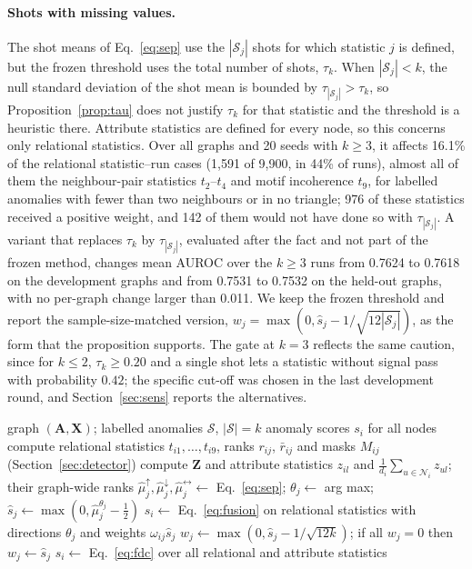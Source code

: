 \documentclass[pdflatex,sn-mathphys-ay]{sn-jnl}
\theoremstyle{plain}
\theoremstyle{remark}
\begin{document}
\paragraph{Shots with missing values.} The shot means of Eq.~\eqref{eq:sep} use the $|\mathcal{S}_j|$ shots for which statistic $j$ is defined, but the frozen threshold uses the total number of shots, $\tau_k$. When $|\mathcal{S}_j|<k$, the null standard deviation of the shot mean is bounded by $\tau_{|\mathcal{S}_j|}>\tau_k$, so Proposition~\ref{prop:tau} does not justify $\tau_k$ for that statistic and the threshold is a heuristic there. Attribute statistics are defined for every node, so this concerns only relational statistics. Over all graphs and 20 seeds with $k\ge3$, it affects 16.1\% of the relational statistic--run cases (1{,}591 of 9{,}900, in 44\% of runs), almost all of them the neighbour-pair statistics $t_2$--$t_4$ and motif incoherence $t_9$, for labelled anomalies with fewer than two neighbours or in no triangle; 976 of these statistics received a positive weight, and 142 of them would not have done so with $\tau_{|\mathcal{S}_j|}$. A variant that replaces $\tau_k$ by $\tau_{|\mathcal{S}_j|}$, evaluated after the fact and not part of the frozen method, changes mean AUROC over the $k\ge3$ runs from 0.7624 to 0.7618 on the development graphs and from 0.7531 to 0.7532 on the held-out graphs, with no per-graph change larger than 0.011. We keep the frozen threshold and report the sample-size-matched version, $w_j=\max(0,\hat s_j-1/\sqrt{12|\mathcal{S}_j|})$, as the form that the proposition supports. The gate at $k=3$ reflects the same caution, since for $k\le2$, $\tau_k\ge0.20$ and a single shot lets a statistic without signal pass with probability $0.42$; the specific cut-off was chosen in the last development round, and Section~\ref{sec:sens} reports the alternatives.

\begin{algorithm}[!ht]
\caption{Few-shot direction calibration (FDC)}\label{alg:fdc}
\begin{algorithmic}[1]
\Require graph $(\mathbf{A},\mathbf{X})$; labelled anomalies $\mathcal{S}$, $|\mathcal{S}|=k$
\Ensure anomaly scores $s_i$ for all nodes
\State compute relational statistics $t_{i1},\dots,t_{i9}$, ranks $r_{ij}$, $\bar r_{ij}$ and masks $M_{ij}$ (Section~\ref{sec:detector})
\State compute $\mathbf{Z}$ and attribute statistics $z_{il}$ and $\frac{1}{d_i}\sum_{u\in\mathcal{N}_i}z_{ul}$; their graph-wide ranks
  \State $\hat\mu^{\uparrow}_j,\hat\mu^{\downarrow}_j,\hat\mu^{\leftrightarrow}_j\gets$ Eq.~\eqref{eq:sep}; $\theta_j\gets$ arg max; $\hat s_j\gets\max(0,\hat\mu^{\theta_j}_j-\tfrac12)$
\EndFor
{}
  \State $s_i\gets$ Eq.~\eqref{eq:fusion} on relational statistics with directions $\theta_j$ and weights $\omega_{ij}\hat s_j$ 
\Else
  \State $w_j\gets\max(0,\hat s_j-1/\sqrt{12k})$; if all $w_j=0$ then $w_j\gets\hat s_j$
  \State $s_i\gets$ Eq.~\eqref{eq:fdc} over all relational and attribute statistics
\EndIf
\end{algorithmic}
\end{algorithm}
\end{document}
